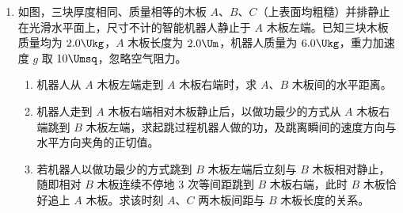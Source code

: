 \documentclass[\gkver]{gaokaozhenti}
\begin{document}
\begin{enumerate}
{故 $CD$ 棒所受的安培力最小为 $F_{\min}=BI_{\min}L=\frac{B^{2}L^{3}\omega}{2R}$

（2）当 $CD$ 棒受到的安培力最小时根据平衡条件得 $mg\sin\theta-\mu mg\cos\theta-F_{\min}=0$

当 $CD$ 棒受到的安培力最大时根据平衡条件得 $F_{\max}-mg\sin\theta-\mu mg\cos\theta=0$

联立解得 $m=\frac{3B^{2}L^{3}\omega}{4Rg\sin\theta}$

撤去推力瞬间，根据牛顿第二定律得 $F_{\max} + \mu mg \cos \theta - mg \sin \theta = ma$

解得 $\mu = \frac{a}{g \cos \theta} - \frac{\tan \theta}{3}$
}

\item
如图，三块厚度相同、质量相等的木板 $A$、$B$、$C$（上表面均粗糙）并排静止在光滑水平面上，尺寸不计的智能机器人静止于 $A$ 木板左端。已知三块木板质量均为 $2.0 \Ukg$，$A$ 木板长度为 $2.0 \Um$，机器人质量为 $6.0 \Ukg$，重力加速度 $g$ 取 $10 \Umsq$，忽略空气阻力。
\begin{enumerate}
	\item
	机器人从 $A$ 木板左端走到 $A$ 木板右端时，求 $A$、$B$ 木板间的水平距离。
	\item
	机器人走到 $A$ 木板右端相对木板静止后，以做功最少的方式从 $A$ 木板右端跳到 $B$ 木板左端，求起跳过程机器人做的功，及跳离瞬间的速度方向与水平方向夹角的正切值。
	\item
	若机器人以做功最少的方式跳到 $B$ 木板左端后立刻与 $B$ 木板相对静止，随即相对 $B$ 木板连续不停地 3 次等间距跳到 $B$ 木板右端，此时 $B$ 木板恰好追上 $A$ 木板。求该时刻 $A$、$C$ 两木板间距与 $B$ 木板长度的关系。
\end{enumerate}

\end{enumerate}
\end{document}
